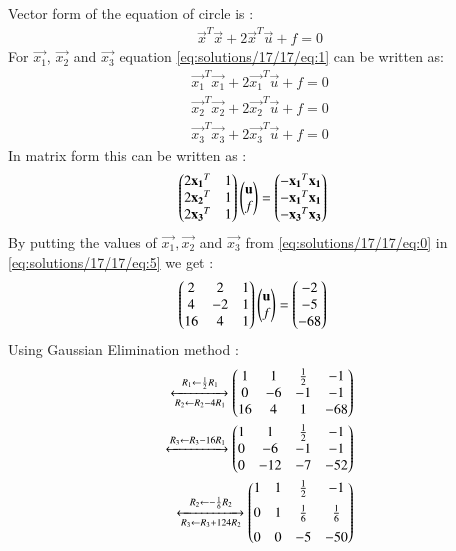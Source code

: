Vector form of the equation of circle is :
\begin{align}
\vec{x}^T\vec{x}+2\vec{x}^T\vec{u}+f=0\label{eq:solutions/17/17/eq:1}
\end{align}
For $\vec{x_1}$, $\vec{x_2}$ and $\vec{x_3}$ equation \eqref{eq:solutions/17/17/eq:1} can be written as:
\begin{align}
\vec{x_1}^T\vec{x_1}+2\vec{x_1}^T\vec{u}+f=0\\
\vec{x_2}^T\vec{x_2}+2\vec{x_2}^T\vec{u}+f=0\\
\vec{x_3}^T\vec{x_3}+2\vec{x_3}^T\vec{u}+f=0
\end{align}
In matrix form this can be written as :
\begin{align}
    \begin{pmatrix}2\mathbf{x_1}^T&1\\2\mathbf{x_2}^T&1\\2\mathbf{x_3}^T&1\end{pmatrix}\begin{pmatrix}\mathbf{u}\\f\end{pmatrix}&=\begin{pmatrix}-\mathbf{x_1}^T\mathbf{x_1}\\-\mathbf{x_1}^T\mathbf{x_1}\\-\mathbf{x_3}^T\mathbf{x_3}\end{pmatrix}\label{eq:solutions/17/17/eq:5}
\end{align}
By putting the values of $\vec{x_1},\vec{x_2}$ and $\vec{x_3}$ from \eqref{eq:solutions/17/17/eq:0} in \eqref{eq:solutions/17/17/eq:5} we get :   
\begin{align}
 \begin{pmatrix}2&2&1\\4&-2&1\\16&4&1\end{pmatrix}\begin{pmatrix}\mathbf{u}\\f\end{pmatrix}&=\begin{pmatrix}-2\\-5\\-68\end{pmatrix} \label{eq:solutions/17/17/eq:6}
\end{align}
Using Gaussian Elimination method :
\begin{align}
\xleftrightarrow[R_2 \leftarrow R_2-4R_1]{R_1 \leftarrow \frac{1}{2}R_1}\begin{pmatrix}1&1&\frac{1}{2}&-1\\0&-6&-1&-1\\16&4&1&-68\end{pmatrix}\\
\xleftrightarrow{R_3 \leftarrow R_3-16R_1}\begin{pmatrix}1&1&\frac{1}{2}&-1\\0&-6&-1&-1\\0&-12&-7&-52\end{pmatrix}\\
\xleftrightarrow[R_3 \leftarrow R_3+124R_2]{R_2 \leftarrow -\frac{1}{6}R_2}\begin{pmatrix}1&1&\frac{1}{2}&-1\\[0.2cm]0&1&\frac{1}{6}&\frac{1}{6}\\[0.2cm]0&0&-5&-50\end{pmatrix}\label{eq:solutions/17/17/eq:9}
\end{align}
